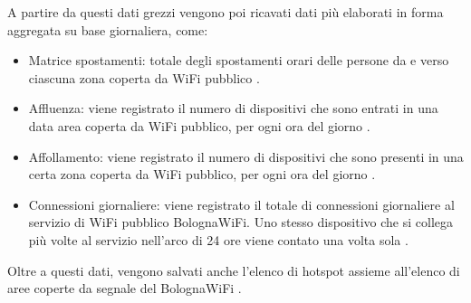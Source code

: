A partire da questi dati grezzi vengono poi ricavati dati più elaborati in forma aggregata su base giornaliera, come:
\begin{itemize}
    \item Matrice spostamenti: totale degli spostamenti orari delle persone da e verso ciascuna zona coperta da WiFi pubblico \cite{BolognaWiFi_Spostamenti}.
    \item Affluenza: viene registrato il numero di dispositivi che sono entrati in una data area coperta da WiFi pubblico, per ogni ora del giorno \cite{BolognaWiFi_Affluenza}.
    \item Affollamento: viene registrato il numero di dispositivi che sono presenti in una certa zona coperta da WiFi pubblico, per ogni ora del giorno \cite{BolognaWiFi_Affollamento}.
    \item Connessioni giornaliere: viene registrato il totale di connessioni giornaliere al servizio di WiFi pubblico BolognaWiFi. Uno stesso dispositivo che si collega più volte al servizio nell'arco di 24 ore viene contato una volta sola \cite{BolognaWiFi_Connessioni_Giornaliere}.
\end{itemize}
Oltre a questi dati, vengono salvati anche l'elenco di hotspot \cite{BolognaWiFi_Elenco_Hotspot} assieme all'elenco di aree coperte da segnale del BolognaWiFi \cite{BolognaWiFi_Elenco_Aree_Segnale}.





